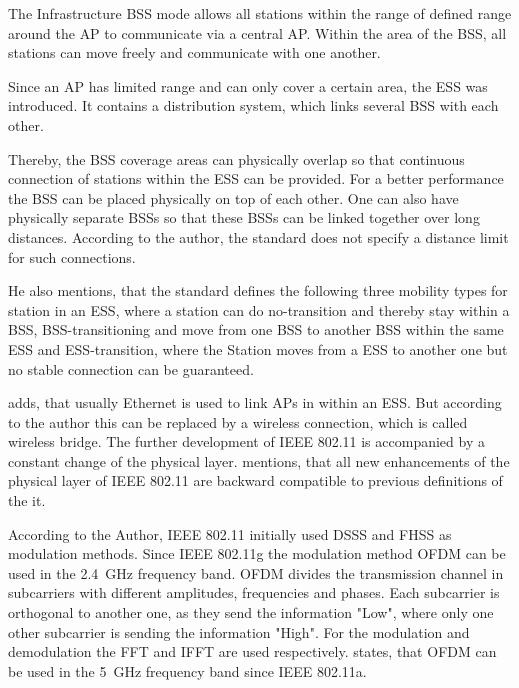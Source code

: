 \documentclass[]{nsm-thesis}
\begin{document}
The Infrastructure \ac{BSS} mode allows all stations within the range of defined range around the \ac{AP} to communicate via a central \ac{AP}. Within the area of the \ac{BSS}, all stations can move freely and communicate with one another.

Since an \ac{AP} has limited range and can only cover a certain area, the \ac{ESS} was introduced. It contains a distribution system, which links several \ac{BSS} with each other.

Thereby, the BSS coverage areas can physically overlap so that continuous connection of stations within the ESS can be provided. For a better performance the \ac{BSS} can be placed physically on top of each other. One can also have physically separate \ac{BSS}s so that these \ac{BSS}s can be linked together over long distances. According to the author, the standard does not specify a distance limit for such connections. 

He also mentions, that the standard defines the following three mobility types for station in an \ac{ESS}, where a station can do no-transition and thereby stay within a \ac{BSS}, \ac{BSS}-transitioning and move from one \ac{BSS} to another \ac{BSS} within the same \ac{ESS} and \ac{ESS}-transition, where the Station moves from a \ac{ESS} to another one but no stable connection can be guaranteed.

\textcite{sauter_wireless_2022} adds, that usually Ethernet is used to link \ac{AP}s in within an \ac{ESS}. But according to the author this can be replaced by a wireless connection, which is called wireless bridge.
The further development of IEEE 802.11 is accompanied by a constant change of the physical layer. \textcite{sauter_wireless_2022} mentions, that all new enhancements of the physical layer of IEEE 802.11 are backward compatible to previous definitions of the it.

According to the Author, IEEE 802.11 initially used DSSS and FHSS as modulation methods.
Since IEEE 802.11g the modulation method \ac{OFDM} can be used in the \SI{2.4}{\giga\hertz} frequency band. \ac{OFDM} divides the transmission channel in subcarriers with different amplitudes, frequencies and phases. Each subcarrier is orthogonal to another one, as they send the information "Low", where only one other subcarrier is sending the information "High".
For the modulation and demodulation the FFT and IFFT are used respectively.
\textcite{kauffels_wireless_2002} states, that \ac{OFDM} can be used in the \SI{5}{\giga\hertz} frequency band since IEEE 802.11a.
\end{document}
